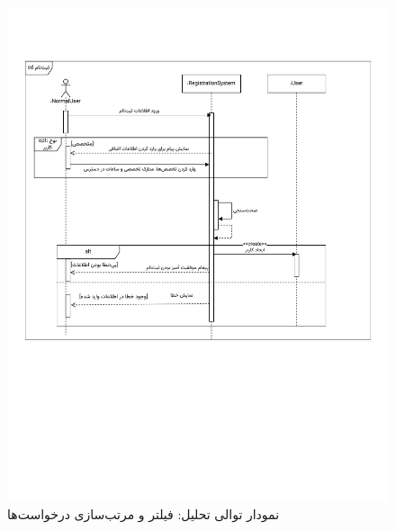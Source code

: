 \begin{figure}[ht!]
	\centering
	\includegraphics[scale=0.6, page=9]{figs/OOD-Sequence-1.pdf}
	\caption{نمودار توالی تحلیل: فیلتر و مرتب‌سازی درخواست‌ها}
\end{figure}
\FloatBarrier
\newpage

